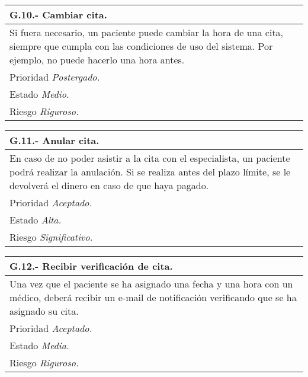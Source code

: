 \documentclass[a4paper,oneside,11pt]{book}
\begin{document}
\begin{center}
\begin{tabulary}{15cm}{|L|}
	\hline
		\bf{G.10.- Cambiar cita.} \\
	\hline
		Si fuera necesario, un paciente puede cambiar la hora de una cita, siempre que cumpla con las condiciones de uso del sistema. Por ejemplo, no puede hacerlo una hora antes. \\
	\hline
		Prioridad \textit{Postergado.} \\
	\hline
		Estado \textit{Medio.} \\
	\hline
		Riesgo \textit{Riguroso.} \\
	\hline
\end{tabulary}
\end{center}

\begin{center}
\begin{tabulary}{15cm}{|L|}
	\hline
		\bf{G.11.- Anular cita.} \\
	\hline
		En caso de no poder asistir a la cita con el especialista, un paciente podrá realizar la anulación. Si se realiza antes del plazo límite, se le devolverá el dinero en caso de que haya pagado. \\
	\hline
		Prioridad \textit{Aceptado.} \\
	\hline
		Estado \textit{Alta.} \\
	\hline
		Riesgo \textit{Significativo.} \\
	\hline
\end{tabulary}
\end{center}

\begin{center}
\begin{tabulary}{15cm}{|L|}
	\hline
		\bf{G.12.- Recibir verificación de cita.} \\
	\hline
		Una vez que el paciente se ha asignado una fecha y una hora con un médico, deberá recibir un e-mail de notificación verificando que se ha asignado su cita. \\
	\hline
		Prioridad \textit{Aceptado.} \\
	\hline
		Estado \textit{Media.} \\
	\hline
		Riesgo \textit{Riguroso.} \\
	\hline
\end{tabulary}
\end{center}
\end{document}
